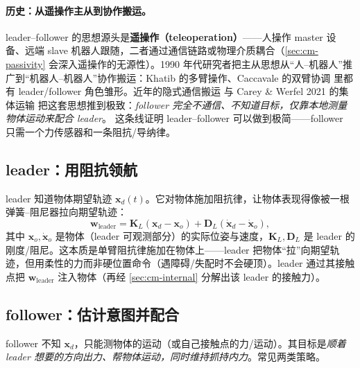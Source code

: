 \paragraph{历史：从遥操作主从到协作搬运。}
leader--follower 的思想源头是\textbf{遥操作（teleoperation）}——人操作 master 设备、远端 slave 机器人跟随，二者通过通信链路或物理介质耦合（\cref{sec:cm-passivity} 会深入遥操作的无源性）。1990 年代研究者把主从思想从“人–机器人”推广到“机器人–机器人”协作搬运：Khatib 的多臂操作\cite{khatib1988object}、Caccavale 的双臂协调\cite{caccavale2008six} 里都有 leader/follower 角色雏形。近年的隐式通信搬运\cite{wang2018collaborative} 与 Carey \& Werfel 2021 的集体运输\cite{carey2021collective} 把这套思想推到极致：\emph{follower 完全不通信、不知道目标，仅靠本地测量物体运动来配合 leader}。
这条线证明 leader--follower 可以做到极简——follower 只需一个力传感器和一条阻抗/导纳律。

\subsection{leader：用阻抗领航}
\label{sec:cm-leader-law}
leader 知道物体期望轨迹 $\mathbf{x}_d(t)$。它对物体施加阻抗律，让物体表现得像被一根弹簧–阻尼器拉向期望轨迹：
\begin{equation}
  \mathbf{w}_{\text{leader}}=\mathbf{K}_L(\mathbf{x}_d-\mathbf{x}_o)+\mathbf{D}_L(\dot{\mathbf{x}}_d-\dot{\mathbf{x}}_o),
  \label{eq:cm-leader}
\end{equation}
其中 $\mathbf{x}_o,\dot{\mathbf{x}}_o$ 是物体（leader 可观测部分）的实际位姿与速度，$\mathbf{K}_L,\mathbf{D}_L$ 是 leader 的刚度/阻尼。这本质是单臂阻抗律施加在物体上——leader 把物体“拉”向期望轨迹，但用柔性的力而非硬位置命令（遇障碍/失配时不会硬顶）。leader 通过其接触点把 $\mathbf{w}_{\text{leader}}$ 注入物体（再经 \cref{sec:cm-internal} 分解出该 leader 的接触力）。

\subsection{follower：估计意图并配合}
\label{sec:cm-follower-law}
follower 不知 $\mathbf{x}_d$，只能测物体的运动（或自己接触点的力/运动）。其目标是\emph{顺着 leader 想要的方向出力、帮物体运动，同时维持抓持内力}。常见两类策略。

